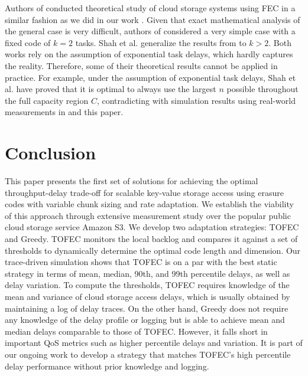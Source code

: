 \documentclass[journal]{IEEEtran}
\newcommand{\ourproposal}{TOFEC\xspace}
\newcommand{\CapFull}{C}
\begin{document}
Authors of \cite{Longbocodeingincloud} conducted theoretical study of cloud storage systems using FEC in a similar fashion as we did in our work \cite{fastcloud}. Given that exact mathematical analysis of the general case is very difficult, authors of \cite{Longbocodeingincloud} considered a very simple case with a fixed code of $k=2$ tasks. Shah et al. \cite{MDS-queue} generalize the results from \cite{Longbocodeingincloud} to $k>2$. Both works rely on the assumption of exponential task delays, which hardly captures the reality. Therefore, some of their theoretical results cannot be applied in practice.
For example, under the assumption of exponential task delays, Shah et al. have proved that it is optimal to always use the largest $n$ possible throughout the full capacity region $\CapFull$,
contradicting with simulation results using real-world measurements in \cite{fastcloud} and this paper. 


\section{Conclusion}
\label{sec:conclusion}
This paper presents the first set of solutions for achieving the optimal throughput-delay trade-off for scalable key-value storage access using erasure codes with variable chunk sizing and rate adaptation. We establish the viability of this approach through extensive measurement study over the popular public cloud storage service Amazon S3. We develop two adaptation strategies: \ourproposal and Greedy.  \ourproposal monitors the local backlog and compares it against a set of thresholds to dynamically determine the optimal code length and dimension. Our trace-driven simulation shows that \ourproposal is on a par with the best static strategy in terms of mean, median, 90th, and 99th percentile delays, as well as delay variation. To compute the thresholds, \ourproposal requires knowledge of the mean and variance of cloud storage access delays, which is usually obtained by maintaining a log of delay traces. On the other hand, Greedy does not require any knowledge of the delay profile or logging but is able to achieve mean and median delays comparable to those of \ourproposal. However, it falls short in important QoS metrics such as higher percentile delays and variation. It is part of our ongoing work to develop a strategy that matches \ourproposal's high percentile delay performance without prior knowledge and logging.
\end{document}
